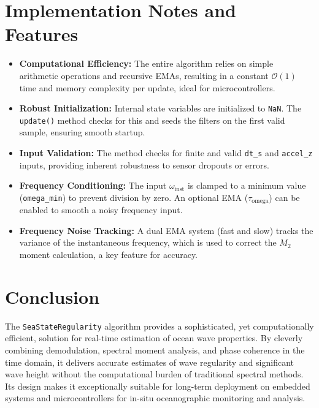 \documentclass[11pt]{article}
\begin{document}
\section{Implementation Notes and Features}
\begin{itemize}
    \item \textbf{Computational Efficiency:} The entire algorithm relies on simple arithmetic operations and recursive EMAs, resulting in a constant $\mathcal{O}(1)$ time and memory complexity per update, ideal for microcontrollers.
    \item \textbf{Robust Initialization:} Internal state variables are initialized to \texttt{NaN}. The \texttt{update()} method checks for this and seeds the filters on the first valid sample, ensuring smooth startup.
    \item \textbf{Input Validation:} The method checks for finite and valid \texttt{dt\_s} and \texttt{accel\_z} inputs, providing inherent robustness to sensor dropouts or errors.
    \item \textbf{Frequency Conditioning:} The input $\omega_{\text{inst}}$ is clamped to a minimum value (\texttt{omega\_min}) to prevent division by zero. An optional EMA ($\tau_{\text{omega}}$) can be enabled to smooth a noisy frequency input.
    \item \textbf{Frequency Noise Tracking:} A dual EMA system (fast and slow) tracks the variance of the instantaneous frequency, which is used to correct the $M_2$ moment calculation, a key feature for accuracy.
\end{itemize}

\section{Conclusion}
The \texttt{SeaStateRegularity} algorithm provides a sophisticated, yet computationally efficient, solution for real-time estimation of ocean wave properties. By cleverly combining demodulation, spectral moment analysis, and phase coherence in the time domain, it delivers accurate estimates of wave regularity and significant wave height without the computational burden of traditional spectral methods. Its design makes it exceptionally suitable for long-term deployment on embedded systems and microcontrollers for in-situ oceanographic monitoring and analysis.
\end{document}
